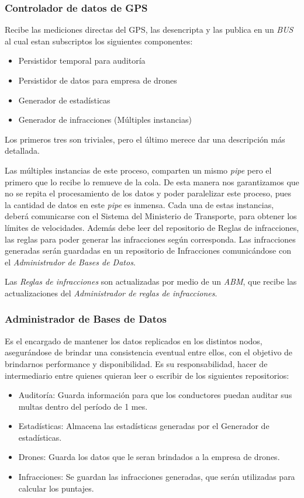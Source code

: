 \subsubsection{Controlador de datos de GPS}

Recibe las mediciones directas del GPS, las desencripta y las publica en un \textit{BUS} 
al cual estan subscriptos los siguientes componentes:

\begin{itemize}
  \item Persistidor temporal para auditoría
  \item Persistidor de datos para empresa de drones
  \item Generador de estadísticas
  \item Generador de infracciones (Múltiples instancias)
\end{itemize}

Los primeros tres son triviales, pero el último merece dar una descripción más 
detallada.

Las múltiples instancias de este proceso, comparten un mismo \textit{pipe} pero 
el primero que lo recibe lo remueve de la cola. De esta manera nos garantizamos 
que no se repita el procesamiento de los datos y poder paralelizar este 
proceso, pues la cantidad de datos en este \textit{pipe} es inmensa.
Cada una de estas instancias, deberá comunicarse con el Sistema del Ministerio 
de Transporte, para obtener los límites de velocidades. Además debe leer del 
repositorio de Reglas de infracciones, las reglas para poder generar las 
infracciones según corresponda.
Las infracciones generadas serán guardadas en un repositorio de Infracciones 
comunicándose con el \textit{Administrador de Bases de Datos}.

Las \textit{Reglas de infracciones} son actualizadas por medio de un 
\textit{ABM}, que recibe las actualizaciones del \textit{Administrador de reglas de 
infracciones}.


\subsubsection{Administrador de Bases de Datos}
Es el encargado de mantener los datos replicados en los distintos nodos, 
asegurándose de brindar una consistencia eventual entre ellos, con el objetivo 
de brindarnos performance y disponibilidad.
Es su responsabilidad, hacer de intermediario entre quienes quieran leer o 
escribir de los siguientes repositorios:

\begin{itemize}
  \item Auditoría: Guarda información para que los conductores puedan auditar 
  sus multas dentro del período de 1 mes.
  \item Estadísticas: Almacena las estadísticas generadas por el Generador de estadísticas.
  \item Drones: Guarda los datos que le seran brindados a la empresa de drones.
  \item Infracciones: Se guardan las infracciones generadas, que serán utilizadas 
  para calcular los puntajes.
\end{itemize}


